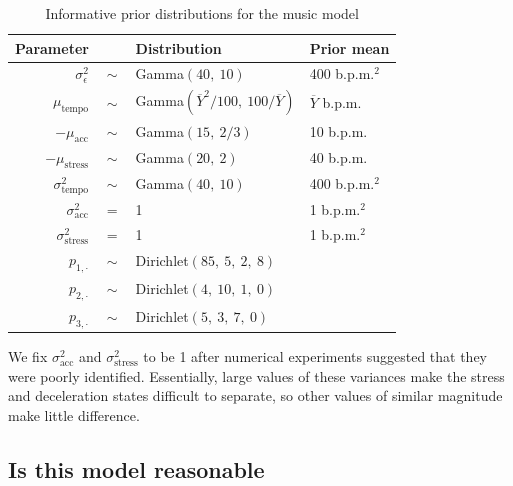 \documentclass[aoas]{imsart}
\begin{document}
\begin{table}[t]
    \caption{Informative prior distributions for the music model}
  \label{tab:priors}
  \centering
  \begin{tabular}{@{}rcll@{}}
    \toprule
    Parameter & \phantom{a} & Distribution & Prior mean\\
    \midrule
    $\sigma^2_{\epsilon}$ & $\sim$ & Gamma$(40,\ 10)$ & 400 b.p.m.$^2$\\
    $\mu_{\textrm{tempo}}$ & $\sim$ & Gamma$(\overline{Y}^2/100,\ 100
                                      /\overline{Y})$ & $\overline{Y}$
                                                        b.p.m.\\
    $-\mu_{\textrm{acc}} $ & $\sim$ & Gamma$(15,\ 2/3)$ & 10 b.p.m.\\
    $-\mu_{\textrm{stress}} $ & $\sim$ & Gamma$(20,\ 2)$ & 40 b.p.m.\\
    $\sigma^2_{\textrm{tempo}} $ & $\sim$ & Gamma$(40,\ 10)$ & 400
                                                               b.p.m.$^2$\\
    $\sigma^2_{\textrm{acc}} $ & $=$ & 1 & 1 b.p.m.$^2$\\
    $\sigma^2_{\textrm{stress}} $ & $=$ & 1 & 1 b.p.m.$^2$\\
    $p_{1,\cdot}$ & $\sim$ & Dirichlet$(85,\ 5,\ 2,\ 8)$ \\
    $p_{2,\cdot}$ & $\sim$ & Dirichlet$(4,\ 10,\ 1,\ 0)$ \\
    $p_{3,\cdot}$ & $\sim$ & Dirichlet$(5,\ 3,\ 7,\ 0)$ \\
    \bottomrule
  \end{tabular}
\end{table}
We fix $\sigma^2_{\textrm{acc}}$ and $\sigma^2_{\textrm{stress}}$ to
be 1 after numerical experiments suggested
that they were poorly identified. Essentially, large values of these
variances make the stress and deceleration states difficult to
separate, so other values of similar magnitude make little difference.

\subsection{Is this model reasonable}
\end{document}
